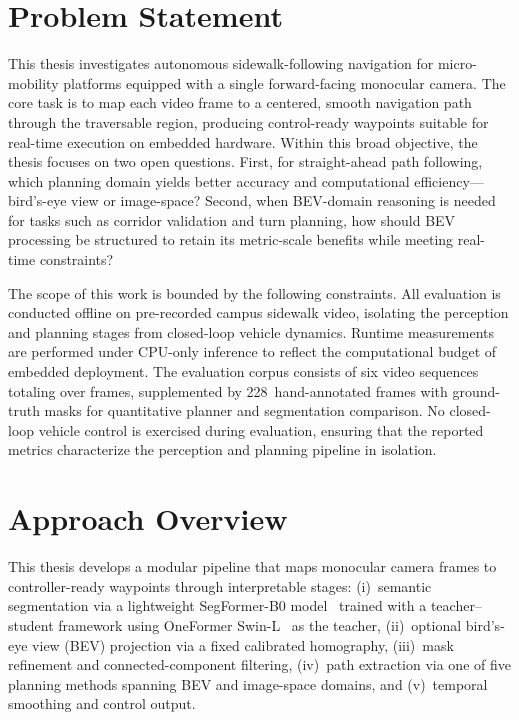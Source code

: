 \documentclass[12pt,letterpaper,oneside]{report}
\begin{document}
\section{Problem Statement}

This thesis investigates autonomous sidewalk-following navigation for micro-mobility platforms equipped with a single forward-facing monocular camera. The core task is to map each video frame to a centered, smooth navigation path through the traversable region, producing control-ready waypoints suitable for real-time execution on embedded hardware. Within this broad objective, the thesis focuses on two open questions. First, for straight-ahead path following, which planning domain yields better accuracy and computational efficiency---bird's-eye view or image-space? Second, when BEV-domain reasoning is needed for tasks such as corridor validation and turn planning, how should BEV processing be structured to retain its metric-scale benefits while meeting real-time constraints?

The scope of this work is bounded by the following constraints. All evaluation is conducted offline on pre-recorded campus sidewalk video, isolating the perception and planning stages from closed-loop vehicle dynamics. Runtime measurements are performed under CPU-only inference to reflect the computational budget of embedded deployment. The evaluation corpus consists of six video sequences totaling over  frames, supplemented by 228~hand-annotated frames with ground-truth masks for quantitative planner and segmentation comparison. No closed-loop vehicle control is exercised during evaluation, ensuring that the reported metrics characterize the perception and planning pipeline in isolation.


\section{Approach Overview}

This thesis develops a modular pipeline that maps monocular camera frames to controller-ready waypoints through interpretable stages: (i)~semantic segmentation via a lightweight SegFormer-B0 model~\cite{segformer} trained with a teacher--student framework using OneFormer Swin-L~\cite{oneformer} as the teacher, (ii)~optional bird's-eye view (BEV) projection via a fixed calibrated homography, (iii)~mask refinement and connected-component filtering, (iv)~path extraction via one of five planning methods spanning BEV and image-space domains, and (v)~temporal smoothing and control output.
\end{document}
